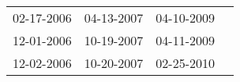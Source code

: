 \begin{supertabular}{llll}
 02-17-2006 &  04-13-2007 &  04-10-2009 \\
 12-01-2006 &  10-19-2007 &  04-11-2009 \\
 12-02-2006 &  10-20-2007 &  02-25-2010 \\
\end{supertabular}
